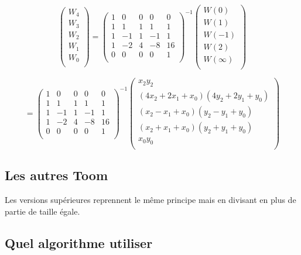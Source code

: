 \documentclass[letterpaper]{article}
\begin{document}
$$
\begin{pmatrix}
  W_4 \\
  W_3 \\
  W_2 \\
  W_1 \\
  W_0 \\
 \end{pmatrix}
=
\begin{pmatrix}
  1 & 0 & 0 & 0 & 0 \\
  1 & 1 & 1 & 1 & 1 \\
  1 &-1 & 1 &-1 & 1 \\
  1 &-2 & 4 &-8 &16 \\
  0 & 0 & 0 & 0 & 1 \\
\end{pmatrix}^{-1}
\begin{pmatrix}
  W (0) \\
  W (1) \\
  W (-1) \\
  W (2) \\
  W (\infty) \\
\end{pmatrix}
$$

$$
=
\begin{pmatrix}
  1 & 0 & 0 & 0 & 0 \\
  1 & 1 & 1 & 1 & 1 \\
  1 &-1 & 1 &-1 & 1 \\
  1 &-2 & 4 &-8 &16 \\
  0 & 0 & 0 & 0 & 1 \\
\end{pmatrix}^{-1}
\begin{pmatrix}
  x_2y_2 \\
  (4x_2 + 2x_1 + x_0) (4y_2+ 2y_1 + y_0)\\
  (x_2 - x_1 + x_0) (y_2 - y_1 + y_0)\\
  (x_2 + x_1 + x_0) (y_2 + y_1 + y_0)\\
  x_0y_0\\
\end{pmatrix}
$$

\subsection{Les autres Toom}

Les versions supérieures reprennent le même principe mais en divisant
en plus de partie de taille égale.

\subsection{Quel algorithme utiliser}
\end{document}
